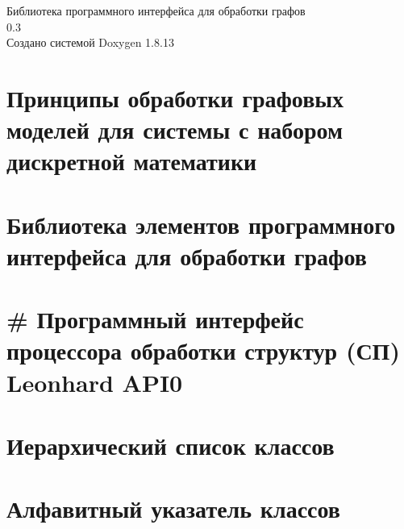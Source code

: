 \documentclass[twoside]{book}
\newcommand{\+}{\discretionary{\mbox{\scriptsize$\hookleftarrow$}}{}{}}
\newcommand{\clearemptydoublepage}{%
  \newpage{\pagestyle{empty}\cleardoublepage}%
}
\begin{document}
\hypersetup{pageanchor=false,
             bookmarksnumbered=true,
             pdfencoding=unicode
            }
\begin{titlepage}
\vspace*{7cm}
\begin{center}%
{\Large Библиотека программного интерфейса для обработки графов \\[1ex]\large 0.\+3 }\\
\vspace*{1cm}
{\large Создано системой Doxygen 1.8.13}\\
\end{center}
\end{titlepage}
\clearemptydoublepage
{}
\tableofcontents
\clearemptydoublepage
{}
\hypersetup{pageanchor=true}

\chapter{Принципы обработки графовых моделей для системы с набором дискретной математики}
\label{md_docs__xD0_x93_xD1_x80_xD0_xB0_xD1_x84_xD0_xBE_xD0_xB2_xD1_x8B_xD0_xB5__xD0_xBC_xD0_xBE_xD0_xB4_xD0_xB5_xD0_xBB_xD0_xB8}

\chapter{Библиотека элементов программного интерфейса для обработки графов}
\label{md__r_e_a_d_m_e}

\chapter{\# Программный интерфейс процессора обработки структур (СП) Leonhard A\+P\+I0}
\label{md_spu-api__readme}

\chapter{Иерархический список классов}

\chapter{Алфавитный указатель классов}

\end{document}
